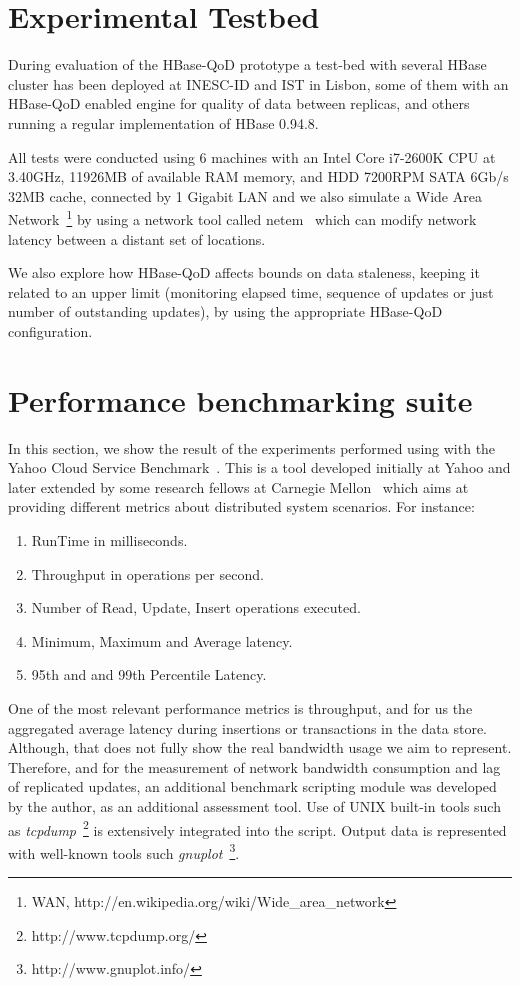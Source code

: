 \section{Experimental Testbed}
During evaluation of the HBase-QoD prototype a test-bed with several HBase cluster has been deployed at INESC-ID and IST in Lisbon, some of them with an HBase-QoD enabled engine for quality of data between replicas, and others running a regular implementation of HBase 0.94.8.

All tests were conducted using 6 machines with an Intel Core i7-2600K CPU at 3.40GHz, 11926MB of available RAM memory, and HDD 7200RPM SATA 6Gb/s 32MB cache, connected by 1 Gigabit LAN and we also simulate a Wide Area Network~\footnote{WAN, http://en.wikipedia.org/wiki/Wide\_area\_network} by using a network tool called netem~\cite{netem:2005} which can modify network latency between a distant set of locations.

We also explore how HBase-QoD affects bounds on data staleness, keeping it related to an upper limit (monitoring elapsed time, sequence of updates or just number of outstanding updates), by using the appropriate HBase-QoD configuration.

\section{Performance benchmarking suite}
In this section, we show the result of the experiments performed using with the Yahoo Cloud Service Benchmark~\cite{YCSB:2010}. This is a tool developed initially at Yahoo and later extended by some research fellows at Carnegie Mellon~\cite{Patil:2011} which aims at providing different metrics about distributed system scenarios. For instance:

\begin{enumerate}
\item RunTime in milliseconds.
\item Throughput in operations per second.
\item Number of Read, Update, Insert operations executed.
\item Minimum, Maximum and Average latency.
\item 95th and and 99th Percentile Latency.
\end{enumerate}

One of the most relevant performance metrics is throughput, and for us the aggregated average latency during insertions or transactions in the data store. Although, that does not fully show the real bandwidth usage we aim to represent. Therefore, and for the measurement of network bandwidth consumption and lag of replicated updates, an additional benchmark scripting module was developed by the author, as an additional assessment tool. Use of UNIX built-in tools such as \emph{tcpdump}~\footnote{http://www.tcpdump.org/} is extensively integrated into the script. Output data is represented with well-known tools such \emph{gnuplot}~\footnote{http://www.gnuplot.info/}.

